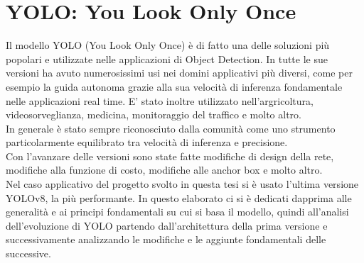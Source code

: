 \documentclass[12pt,a4paper,openright,twoside]{report}
\begin{document}
\section{YOLO: You Look Only Once}
Il modello YOLO (You Look Only Once) è di fatto una delle soluzioni più popolari e utilizzate nelle applicazioni di Object Detection. In tutte le sue versioni ha avuto numerosissimi usi nei domini applicativi più diversi, come per esempio la guida autonoma grazie alla sua velocità di inferenza fondamentale nelle applicazioni real time. E' stato inoltre utilizzato nell'argricoltura, videosorveglianza, medicina, monitoraggio del traffico e molto altro.\\
In generale è stato sempre riconosciuto dalla comunità come uno strumento particolarmente equilibrato tra velocità di inferenza e precisione.\\
Con l'avanzare delle versioni sono state fatte modifiche di design della rete, modifiche alla funzione di costo, modifiche alle anchor box e molto altro. 
\\Nel caso applicativo del progetto svolto in questa tesi si è usato l'ultima versione YOLOv8, la più performante. In questo elaborato ci si è dedicati dapprima alle generalità e ai principi fondamentali su cui si basa il modello, quindi all'analisi dell'evoluzione di YOLO partendo dall'architettura della prima versione e successivamente analizzando le modifiche e le aggiunte fondamentali delle successive.
\end{document}
